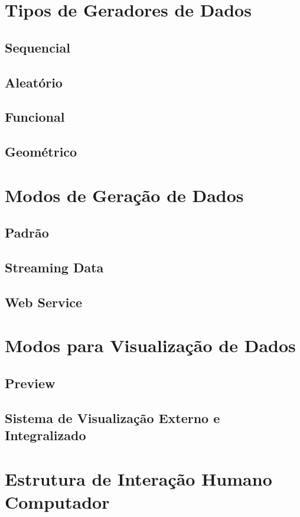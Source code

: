\documentclass[
	12pt,				%
	openright,			%
	twoside,			%
	a4paper,			%
	english,			%
	brazil				%
	]{abntex2}
\begin{document}
	\section{Tipos de Geradores de Dados}

		\subsection{Sequencial}
		\subsection{Aleatório}
		\subsection{Funcional}
		\subsection{Geométrico}

	\section{Modos de Geração de Dados}

		\subsection{Padrão}
		\subsection{Streaming Data}
		\subsection{Web Service}

	\section{Modos para Visualização de Dados}

		\subsection{Preview}
		\subsection{Sistema de Visualização Externo e Integralizado}

	\section{Estrutura de Interação Humano Computador}
\end{document}
